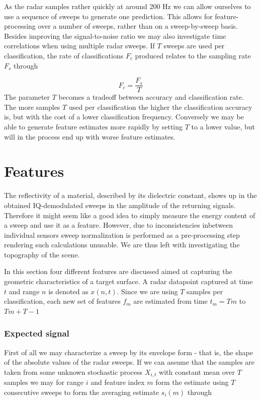 As the radar samples rather quickly at around 200 Hz we can allow ourselves to use a sequence of sweeps to generate one prediction. This allows for feature-processing over a number of sweeps, rather than on a sweep-by-sweep basis. Besides improving the signal-to-noise ratio \citep{w_doerry_2016} we may also investigate time correlations when using multiple radar sweeps. If $T$ sweeps are used per classification, the rate of classifications $F_c$ produced relates to the sampling rate $F_s$ through

\begin{equation}
	F_c = \frac{F_s}{T}
\end{equation} 
The parameter $T$ becomes a tradeoff between accuracy and classification rate. The more samples $T$ used per classification the higher the classification accuracy is, but with the cost of a lower classification frequency. Conversely we may be able to generate feature estimates more rapidly by setting $T$ to a lower value, but will in the process end up with worse feature estimates. 

\section{Features}

The reflectivity of a material, described by its dielectric constant, shows up in the obtained IQ-demodulated sweeps in the amplitude of the returning signals. Therefore it might seem like a good idea to simply measure the energy content of a sweep and use it as a feature. However, due to inconsistencies inbetween individual sensors sweep normalization is performed as a pre-processing step rendering such calculations unusable. We are thus left with investigating the topography of the scene. 

In this section four different features are discussed aimed at capturing the geometric characteristics of a target surface. A radar datapoint captured at time $t$ and range $n$ is denoted as $x(n,t)$. Since we are using $T$ samples per classification, each new set of features $f_m$ are estimated from time $t_m=Tm$ to $Tm+T-1$ 

\subsubsection{Expected signal}

First of all we may characterize a sweep by its envelope form - that is, the shape of the absolute values of the radar sweeps. If we can assume that the samples are taken from some unknown stochastic process $X_{i,t}$ with constant mean over $T$ samples we may for range $i$ and feature index $m$ form the estimate using $T$ consecutive sweeps to form the averaging estimate $s_i(m)$ through



